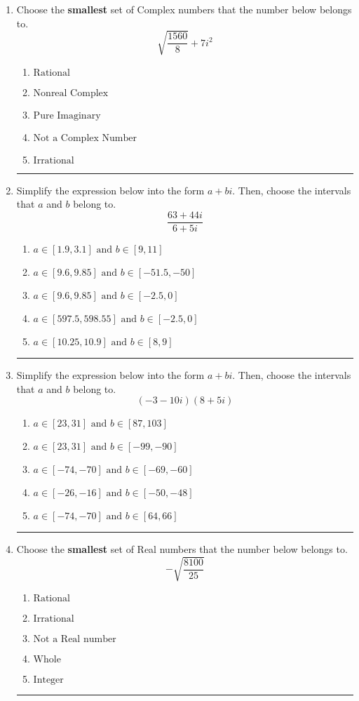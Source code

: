\documentclass[14pt]{extbook}
\newcommand{\litem}[1]{\item#1\hspace*{-1cm}\rule{\textwidth}{0.4pt}}
\begin{document}
\begin{enumerate}
{\begin{enumerate}[label=\Alph*.]
\end{enumerate} }
\litem{
Choose the \textbf{smallest} set of Complex numbers that the number below belongs to.\[ \sqrt{\frac{1560}{8}}+7i^2 \]\begin{enumerate}[label=\Alph*.]
\item \( \text{Rational} \)
\item \( \text{Nonreal Complex} \)
\item \( \text{Pure Imaginary} \)
\item \( \text{Not a Complex Number} \)
\item \( \text{Irrational} \)

\end{enumerate} }
\litem{
Simplify the expression below into the form $a+bi$. Then, choose the intervals that $a$ and $b$ belong to.\[ \frac{63 + 44 i}{6 + 5 i} \]\begin{enumerate}[label=\Alph*.]
\item \( a \in [1.9, 3.1] \text{ and } b \in [9, 11] \)
\item \( a \in [9.6, 9.85] \text{ and } b \in [-51.5, -50] \)
\item \( a \in [9.6, 9.85] \text{ and } b \in [-2.5, 0] \)
\item \( a \in [597.5, 598.55] \text{ and } b \in [-2.5, 0] \)
\item \( a \in [10.25, 10.9] \text{ and } b \in [8, 9] \)

\end{enumerate} }
\litem{
Simplify the expression below into the form $a+bi$. Then, choose the intervals that $a$ and $b$ belong to.\[ (-3 - 10 i)(8 + 5 i) \]\begin{enumerate}[label=\Alph*.]
\item \( a \in [23, 31] \text{ and } b \in [87, 103] \)
\item \( a \in [23, 31] \text{ and } b \in [-99, -90] \)
\item \( a \in [-74, -70] \text{ and } b \in [-69, -60] \)
\item \( a \in [-26, -16] \text{ and } b \in [-50, -48] \)
\item \( a \in [-74, -70] \text{ and } b \in [64, 66] \)

\end{enumerate} }
\litem{
Choose the \textbf{smallest} set of Real numbers that the number below belongs to.\[ -\sqrt{\frac{8100}{25}} \]\begin{enumerate}[label=\Alph*.]
\item \( \text{Rational} \)
\item \( \text{Irrational} \)
\item \( \text{Not a Real number} \)
\item \( \text{Whole} \)
\item \( \text{Integer} \)


\end{enumerate}}
\end{enumerate}
\end{document}

